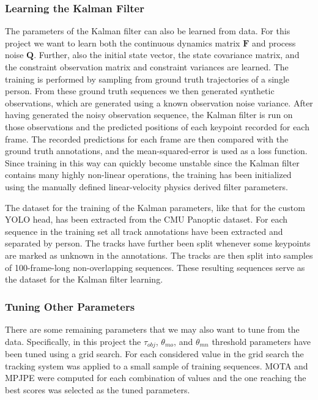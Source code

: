 \subsubsection{Learning the Kalman Filter} \label{learned-kalman}

The parameters of the Kalman filter can also be learned from data. For this project we want to learn both the continuous dynamics matrix $\mathbf{F}$ and process noise $\mathbf{Q}$. Further, also the initial state vector, the state covariance matrix, and the constraint observation matrix and constraint variances are learned. The training is performed by sampling from ground truth trajectories of a single person. From these ground truth sequences we then generated synthetic observations, which are generated using a known observation noise variance. After having generated the noisy observation sequence, the Kalman filter is run on those observations and the predicted positions of each keypoint recorded for each frame. The recorded predictions for each frame are then compared with the ground truth annotations, and the mean-squared-error is used as a loss function. Since training in this way can quickly become unstable since the Kalman filter contains many highly non-linear operations, the training has been initialized using the manually defined linear-velocity physics derived filter parameters.

The dataset for the training of the Kalman parameters, like that for the custom YOLO head, has been extracted from the CMU Panoptic dataset. For each sequence in the training set all track annotations have been extracted and separated by person. The tracks have further been split whenever some keypoints are marked as unknown in the annotations. The tracks are then split into samples of 100-frame-long non-overlapping sequences. These resulting sequences serve as the dataset for the Kalman filter learning.


\subsubsection{Tuning Other Parameters} \label{tune-params}

There are some remaining parameters that we may also want to tune from the data. Specifically, in this project the $\tau_{obj}$, $\theta_{mo}$, and $\theta_{mn}$ threshold parameters have been tuned using a grid search. For each considered value in the grid search the tracking system was applied to a small sample of training sequences. MOTA and MPJPE were computed for each combination of values and the one reaching the best scores was selected as the tuned parameters.
